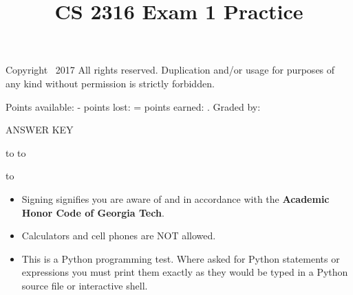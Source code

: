 \documentclass[addpoints,9pt]{exam}
\title{CS 2316 Exam 1 Practice}
\date{}
\begin{document}
\maketitle
\thispagestyle{head}


\runningheader{}
              {\tiny Copyright \textcopyright\ 2017 All rights reserved. Duplication and/or usage for purposes of any kind without permission is strictly forbidden.}
              {}

              {}
              {Points available: \pointsonpage{\thepage} -
               points lost: \makebox[.5in]{\hrulefill} =
               points earned:  \makebox[.5in]{\hrulefill}.
              Graded by: \makebox[.5in]{\hrulefill}}


\ifprintanswers
\begin{center}
{\LARGE ANSWER KEY}
\end{center}
\else
\vspace{0.1in}
\hbox to \textwidth{Name (print clearly): \enspace\hrulefill}
\vspace{0.3in}
\hbox to \textwidth{Signature: \hrulefill}

\vspace{0.3in}
\hbox to \textwidth{GT account username (gtg, gth, msmith3, etc): \enspace\hrulefill}

\fi

\vfill

\begin{itemize}
\item Signing signifies you are aware of and in accordance with the {\bf Academic Honor Code of Georgia Tech}.
\item Calculators and cell phones are NOT allowed.
\item This is a Python programming test.  Where asked for Python statements or expressions you must print them exactly as they would be typed in a Python source file or interactive shell.
\end{itemize}

\vfill

\addpoints
\end{document}
